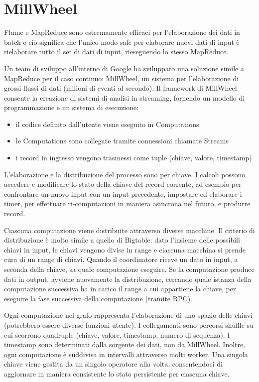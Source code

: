 \section{MillWheel}

Flume e MapReduce sono estremamente efficaci per l'elaborazione dei dati in batch e ciò significa che l'unico modo safe per elaborare nuovi dati di input è rielaborare tutto il set di dati di input, rieseguendo lo stesso MapReduce.

Un team di sviluppo all'interno di Google ha sviluppato una soluzione simile a MapReduce per il caso continuo: MillWheel, un sistema per l'elaborazione di grossi flussi di dati (milioni di eventi al secondo). Il framework di MillWheel consente la creazione di sistemi di analisi in streaming, fornendo un modello di programmazione e un sistema di esecuzione:

\begin{itemize}
    \item il codice definito dall'utente viene eseguito in Computations
    \item le Computations sono collegate tramite connessioni chiamate Streams
    \item i record in ingresso vengono trasmessi come tuple (chiave, valore, timestamp) 
\end{itemize}

L'elaborazione e la distribuzione del processo sono per chiave. I calcoli possono accedere e modificare lo stato della chiave del record corrente, ad esempio per confrontare un nuovo input con un input precedente, impostare ed elaborare i timer, per effettuare ri-computazioni in maniera asincrona nel futuro, e produrre record. 

Ciascuna computazione viene distribuite attraverso diverse macchine. Il criterio di distribuzione è molto simile a quello di Bigtable: dato l'insieme delle possibili chiavi in input, le chiavi vengono divise in range e ciascuna macchina si prende cura di un range di chiavi. Quando il coordinatore riceve un dato in input, a seconda della chiave, sa quale computazione eseguire. Se la computazione produce dati in output, avviene nuovamente la distribuzione, cercando quale istanza della computazione successiva ha in carico il range a cui appartiene la chiave, per eseguire la fase successiva della computazione (tramite RPC).

Ogni computazione nel grafo rappresenta l'elaborazione di uno spazio delle chiavi (potrebbero essere diverse funzioni utente). I collegamenti sono percorsi shuffle su cui scorrono quadruple (chiave, valore, timestamp, numero di sequenza). I timestamp sono determinati dalla sorgente dei dati, non da MillWheel. Inoltre, ogni computazione è suddivisa in intervalli attraverso molti worker. Una singola chiave viene gestita da un singolo operatore alla volta, consentendoci di aggiornare in maniera consistente lo stato persistente per ciascuna chiave. 









